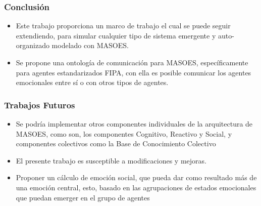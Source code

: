 \documentclass{beamer}
\begin{document}
\begin{frame}
\frametitle{Conclusión}
\begin{itemize}
  \item Este trabajo proporciona un marco de trabajo el cual se puede seguir extendiendo,
  para simular cualquier tipo de sistema emergente y auto-organizado modelado con MASOES.
  \item Se propone una ontología de
  comunicación para MASOES, específicamente para agentes estandarizados FIPA, con ella
  es posible comunicar los agentes emocionales entre sí o con otros tipos de agentes.
\end{itemize}
\end{frame}

\begin{frame}
\frametitle{Trabajos Futuros}
\begin{itemize}
  \item Se podría implementar otros componentes individuales de la arquitectura de MASOES,
  como son, los componentes Cognitivo, Reactivo y Social, y componentes colectivos como
  la Base de Conocimiento Colectivo
  \item El presente trabajo es susceptible a modificaciones y mejoras.
  \item Proponer un cálculo de emoción social,
  que pueda dar como resultado más de una emoción central, esto, basado en las agrupaciones de estados emocionales
  que puedan emerger en el grupo de agentes
\end{itemize}
\end{frame}


\ThankYouFrame
\end{document}
